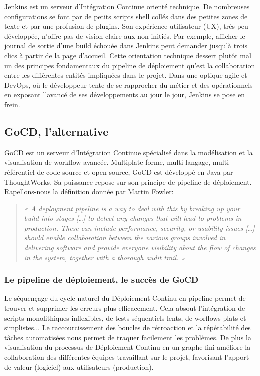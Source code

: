     Jenkins est un serveur d’Intégration Continue orienté technique. De nombreuses configurations se font par de petits scripts shell collés dans des petites zones de texte et par une profusion de plugins. Son expérience utilisateur (UX), très peu développée, n’offre pas de vision claire aux non-initiés. Par exemple, afficher le journal de sortie d’une build échouée dans Jenkins peut demander jusqu’à trois clics à partir de la page d’accueil. Cette orientation technique dessert plutôt mal un des principes fondamentaux du pipeline de déploiement qu’est la collaboration entre les différentes entités impliquées dans le projet. Dans une optique agile et DevOps, où le développeur tente de se rapprocher du métier et des opérationnels en exposant l’avancé de ses développements au jour le jour, Jenkins se pose en frein.

    \subsection{GoCD, l'alternative}
    GoCD est un serveur d'Intégration Continue spécialisé dans la modélisation et la visualisation de workflow avancée. Multiplate-forme, multi-langage, multi-référentiel de code source et open source, GoCD est développé en Java par ThoughtWorks. Sa puissance repose sur son principe de pipeline de déploiement. Rapellons-nous la définition donnée par Martin Fowler:\\

    \begin{quotation}
      \emph{« A deployment pipeline is a way to deal with this by breaking up your build into stages […] to detect any changes that will lead to problems in production. These can include performance, security, or usability issues […] should enable collaboration between the various groups involved in delivering software and provide everyone visibility about the flow of changes in the system, together with a thorough audit trail. »}
    \end{quotation}

    \subsubsection{Le pipeline de déploiement, le succès de GoCD}
    Le séquençage du cycle naturel du Déploiement Continu en pipeline permet de trouver et supprimer les erreurs plus efficacement. Cela absout l'intégration de scripts monolithiques inflexibles, de tests séquentiels lents, de worflows plats et simplistes... Le raccourcissement des boucles de rétroaction et la répétabilité des tâches automatisées nous permet de traquer facilement les problèmes. De plus la visualisation du processus de Déploiement Continu en un graphe fini améliore la collaboration des différentes équipes travaillant sur le projet, favorisant l'apport de valeur (logiciel) aux utilisateurs (production).

